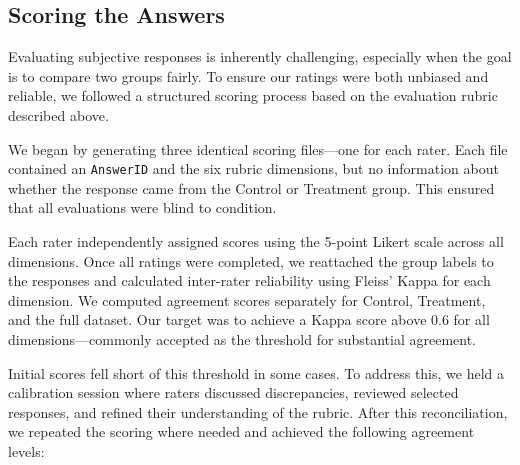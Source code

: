 \subsection{Scoring the Answers}
Evaluating subjective responses is inherently challenging, especially when the goal is to compare two groups fairly. To ensure our ratings were both unbiased and reliable, we followed a structured scoring process based on the evaluation rubric described above.

We began by generating three identical scoring files---one for each rater. Each file contained an \texttt{AnswerID} and the six rubric dimensions, but no information about whether the response came from the Control or Treatment group. This ensured that all evaluations were blind to condition.

Each rater independently assigned scores using the 5-point Likert scale across all dimensions. Once all ratings were completed, we reattached the group labels to the responses and calculated inter-rater reliability using Fleiss' Kappa for each dimension. We computed agreement scores separately for Control, Treatment, and the full dataset. Our target was to achieve a Kappa score above 0.6 for all dimensions---commonly accepted as the threshold for substantial agreement.

Initial scores fell short of this threshold in some cases. To address this, we held a calibration session where raters discussed discrepancies, reviewed selected responses, and refined their understanding of the rubric. After this reconciliation, we repeated the scoring where needed and achieved the following agreement levels:

\begin{table}[H]
\centering
\caption{Fleiss' Kappa Scores by Dimension and Group}
\label{tab:kappa}
\end{table}

